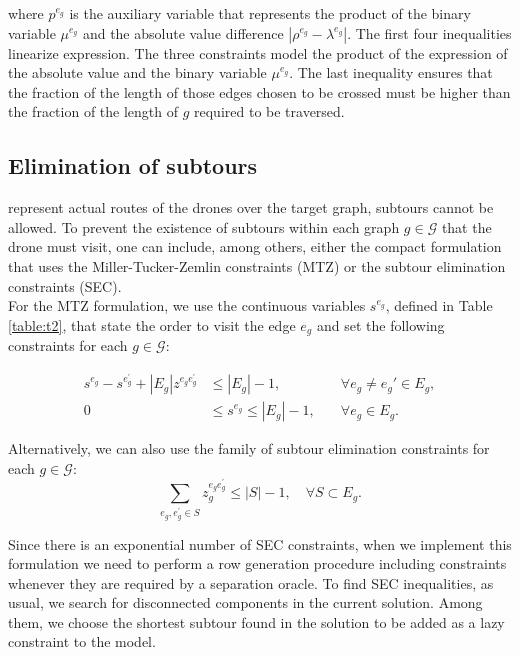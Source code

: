where $p^{e_g}$ is the auxiliary variable that represents the product of the binary variable $\mu^{e_g}$ and the absolute value difference $|\rho^{e_g} - \lambda^{e_g}|$. The first four inequalities linearize  expression. The  three constraints model the product of the expression of the absolute value and the binary variable $\mu^{e_g}$. The last inequality ensures that the fraction of the length of those edges chosen to be crossed must be higher than the fraction of the length of $g$ required to be traversed.

\subsection*{Elimination of subtours}
\noindent
{} represent  actual routes of the drones over the target graph, subtours cannot be allowed.  To prevent the existence of subtours within each graph $g\in \mathcal G$ that the drone must visit, one can include, among others, either the compact formulation that uses the Miller-Tucker-Zemlin constraints (MTZ) or the subtour elimination constraints (SEC).\\
\noindent
For the MTZ formulation, we use the continuous variables $s^{e_g}$, defined in Table \ref{table:t2}, that state the order to visit the edge $e_g$ and set the following constraints for each $g\in\mathcal G$:

\begin{align}
    s^{e_g} - s^{e^\prime_g} + |E_g|z^{e_ge^\prime_g} & \leq |E_g| - 1  , &\quad\forall e_g \neq e_g'\in E_g, \tag{MTZ$_1$} \label{MTZ1}\\
    0 & \leq s^{e_g} \leq |E_g| - 1, &\quad\forall e_g\in E_g.\tag{MTZ$_2$}\label{MTZ2}
\end{align}

\noindent
Alternatively, we can also use the family of subtour elimination constraints for each $g\in\mathcal G$:
\begin{equation}\tag{SEC}\label{SEC}
    \sum_{e_g, e^\prime_g \in S} z_g^{e_ge^\prime_g} \leq |S| - 1, \quad \forall S\subset E_g.
\end{equation}

\noindent
Since there is an exponential number of SEC constraints, when we implement this formulation\RE{,} we need to perform a row generation procedure including constraints whenever they are required by a separation oracle. To find SEC inequalities, as usual, we search for disconnected components in the current solution. Among them, we choose the shortest subtour found in the solution to be added as a lazy constraint to the model.\\

